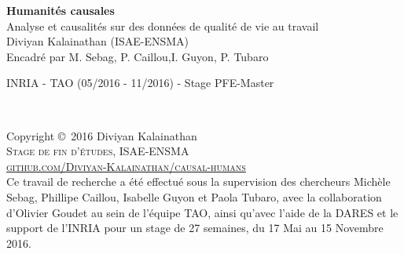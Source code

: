 \documentclass[11pt,fleqn,openany,frenchb]{book} %
\begin{document}

\begingroup
\thispagestyle{empty}
\centering
\vspace*{5cm}
\par\normalfont\fontsize{35}{35}\sffamily\selectfont
\textbf{Humanités causales}\\
{\LARGE Analyse et causalités sur des données de qualité de vie au travail} \\%
\vspace*{0.5cm}
{\Huge Diviyan Kalainathan (ISAE-ENSMA)}\\
{\huge Encadré par M. Sebag, P. Caillou,\newline I. Guyon, P. Tubaro}\par %
{\Large INRIA - TAO (05/2016 - 11/2016) - Stage PFE-Master}\par
\endgroup


\newpage
~\vfill
\thispagestyle{empty}

\noindent Copyright \copyright\ 2016 Diviyan Kalainathan\\ %

\noindent \textsc{Stage de fin d'études, ISAE-ENSMA}\\

\noindent \textsc{\href{https://github.com/Diviyan-Kalainathan/causal-humans}{github.com/Diviyan-Kalainathan/causal-humans}}\\ %


\noindent Ce travail de recherche a été effectué sous la supervision des chercheurs Michèle Sebag, Phillipe Caillou, Isabelle Guyon et Paola Tubaro, avec la collaboration  d'Olivier Goudet au sein de l'équipe TAO, ainsi qu'avec l'aide de la DARES et le support de l'INRIA pour un stage de 27 semaines, du 17 Mai au 15 Novembre 2016. \\ %


\end{document}
